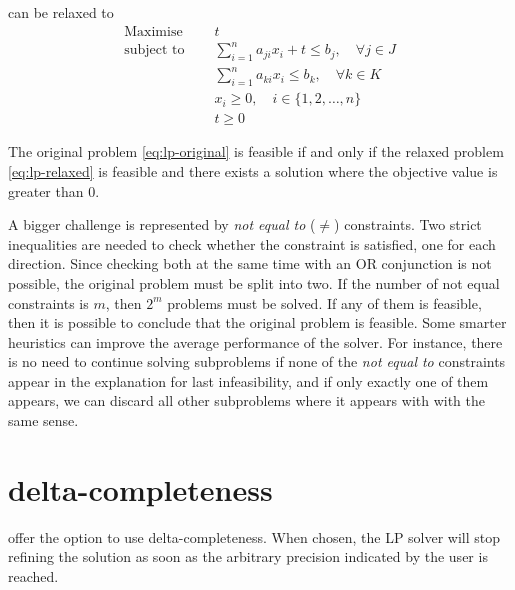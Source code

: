 \documentclass[runningheads]{llncs}
\begin{document}
can be relaxed to
\begin{equation}
    \label{eq:lp-relaxed}
    \begin{split}
        \text{Maximise }   \quad & t                                                             \\
        \text{subject to } \quad & \sum_{i=1}^{n} a_{ji}x_{i} + t \le b_j, \quad \forall j \in J \\
        \quad                    & \sum_{i=1}^{n} a_{ki}x_{i} \le b_k, \quad \forall k \in K     \\
        & x_i \ge 0 , \quad i \in \{1, 2, \ldots, n\}                   \\
        & t \ge 0
    \end{split}
\end{equation}

\begin{theorem}
    \label{thm:lp-relaxed}
    The original problem \eqref{eq:lp-original} is feasible if and only if the relaxed problem \eqref{eq:lp-relaxed} is feasible and there exists a solution where the objective value is greater than $0$.
\end{theorem}

A bigger challenge is represented by \textit{not equal to} ($\ne$) constraints.
Two strict inequalities are needed to check whether the constraint is satisfied, one for each direction.
Since checking both at the same time with an OR conjunction is not possible, the original problem must be split into two.
If the number of not equal constraints is $m$, then $2^m$ problems must be solved.
If any of them is feasible, then it is possible to conclude that the original problem is feasible.
Some smarter heuristics can improve the average performance of the solver.
For instance, there is no need to continue solving subproblems if none of the \textit{not equal to} constraints appear in the explanation for last infeasibility, and if only exactly one of them appears, we can discard all other subproblems where it appears with with the same sense.

\section{delta-completeness}

\dlinear offer the option to use delta-completeness.
When chosen, the LP solver will stop refining the solution as soon as the arbitrary precision indicated by the user is reached.
\end{document}
